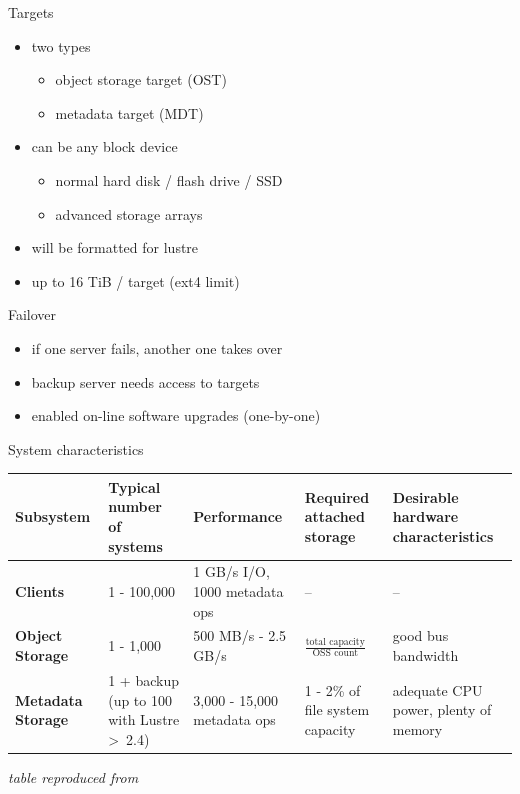 \begin{frame}{Targets}
    \begin{itemize}
        \item two types
            \begin{itemize}
                \item object storage target (OST)
                \item metadata target (MDT)
            \end{itemize}
        \item can be any block device
            \begin{itemize}
                \item normal hard disk / flash drive / SSD
                \item advanced storage arrays
            \end{itemize}
        \item will be formatted for lustre
        \item up to 16 TiB / target (ext4 limit)
    \end{itemize}
\end{frame}

\begin{frame}{Failover}
    \begin{itemize}
        \item if one server fails, another one takes over
        \item backup server needs access to targets
        \item enabled on-line software upgrades (one-by-one)
    \end{itemize}
\end{frame}


\begin{frame}{System characteristics}
    \scriptsize
    \begin{tabularx}{\textwidth}{|X|X|X|X|X|}
        \hline
        \textbf{Subsystem}
        & Typical number of systems
        & Performance
        & Required attached storage
        & Desirable hardware characteristics\\\hline
        \textbf{Clients}
        & 1 - 100,000
        & 1 GB/s I/O, 1000 metadata ops
        & --
        & -- \\[30pt]
        \textbf{Object Storage}
        & 1 - 1,000
        & 500 MB/s - 2.5 GB/s
        & $\frac{\text{total capacity}}{\text{OSS count}}$
        & good bus bandwidth \\[20pt]
        \textbf{Metadata Storage}
        & 1 + backup \tiny (up to 100 with Lustre \textgreater~2.4)
        & 3,000 - 15,000 metadata ops
        & 1 - 2\% of file system capacity
        & adequate CPU power, plenty of memory \\\hline
    \end{tabularx}

    \vspace{0.3cm}
    \hfill{\scriptsize\emph{table reproduced from \cite{whitepaper}}}
\end{frame}
